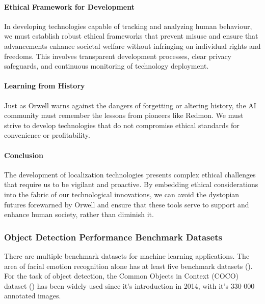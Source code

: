 
\paragraph{Ethical Framework for Development}
In developing technologies capable of tracking and analyzing human behaviour, we must establish robust ethical frameworks that prevent misuse and ensure that advancements enhance societal welfare without infringing on individual rights and freedoms. This involves transparent development processes, clear privacy safeguards, and continuous monitoring of technology deployment.

\paragraph{Learning from History}
Just as Orwell warns against the dangers of forgetting or altering history, the AI community must remember the lessons from pioneers like Redmon. We must strive to develop technologies that do not compromise ethical standards for convenience or profitability.

\paragraph{Conclusion}
The development of localization technologies presents complex ethical challenges that require us to be vigilant and proactive. By embedding ethical considerations into the fabric of our technological innovations, we can avoid the dystopian futures forewarned by Orwell and ensure that these tools serve to support and enhance human society, rather than diminish it.

\subsubsection{Object Detection Performance Benchmark Datasets}
\label{sec:performance_benchmark}

There are multiple benchmark datasets for machine learning applications. The area of facial emotion recognition alone has at least five benchmark datasets (\cite{sa2022facialemotions}). For the task of object detection, the Common Objects in Context (COCO) dataset (\cite{li2014cocodataset}) has been widely used since it's introduction in 2014, with it's 330 000 annotated images.

